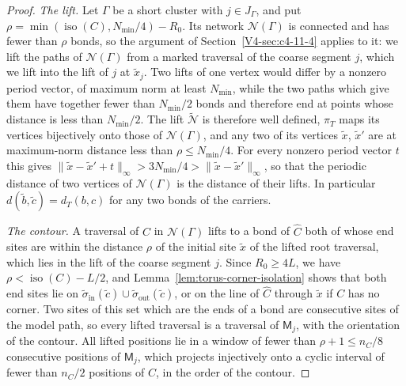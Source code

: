 \documentclass[11pt]{article}
\newcommand{\iso}{\operatorname{iso}}
\numberwithin{equation}{section}
\theoremstyle{remark}
\theoremstyle{plain}
\begin{document}
\begin{proof}
\emph{The lift.} Let $\Gamma$ be a short cluster with $j\in J_{\Gamma}$, and put $\rho=\min(\iso(C),N_{\min}/4)-R_0$. Its network $\mathscr N(\Gamma)$ is connected and has fewer than $\rho$ bonds, so the argument of Section~\ref{V4-sec:c4-11-4} applies to it: we lift the paths of $\mathscr N(\Gamma)$ from a marked traversal of the coarse segment $j$, which we lift into the lift of $j$ at $\tilde x_j$. Two lifts of one vertex would differ by a nonzero period vector, of maximum norm at least $N_{\min}$, while the two paths which give them have together fewer than $N_{\min}/2$ bonds and therefore end at points whose distance is less than $N_{\min}/2$. The lift $\widetilde{\mathscr N}$ is therefore well defined, $\pi_T$ maps its vertices bijectively onto those of $\mathscr N(\Gamma)$, and any two of its vertices $\tilde x$, $\tilde x'$ are at maximum-norm distance less than $\rho\leqslant N_{\min}/4$. For every nonzero period vector $t$ this gives $\|\tilde x-\tilde x'+t\|_{\infty}>3N_{\min}/4>\|\tilde x-\tilde x'\|_{\infty}$, so that the periodic distance of two vertices of $\mathscr N(\Gamma)$ is the distance of their lifts. In particular $d(\tilde b,\tilde c)= d_T(b,c)$ for any two bonds of the carriers.

\emph{The contour.} A traversal of $C$ in $\mathscr N(\Gamma)$ lifts to a bond of $\widehat C$ both of whose end sites are within the distance $\rho$ of the initial site $\tilde x$ of the lifted root traversal, which lies in the lift of the coarse segment $j$. Since $R_0\geqslant 4L$, we have $\rho<\iso(C)-L/2$, and Lemma~\ref{lem:torus-corner-isolation} shows that both end sites lie on $\tilde\sigma_{\mathrm{in}}(\tilde c)\cup\tilde\sigma_{\mathrm{out}}(\tilde c)$, or on the line of $\widehat C$ through $\tilde x$ if $C$ has no corner. Two sites of this set which are the ends of a bond are consecutive sites of the model path, so every lifted traversal is a traversal of $\mathsf M_j$, with the orientation of the contour. All lifted positions lie in a window of fewer than $\rho+1\leqslant n_C/8$ consecutive positions of $\mathsf M_j$, which projects injectively onto a cyclic interval of fewer than $n_C/2$ positions of $C$, in the order of the contour.


\end{proof}
\end{document}
